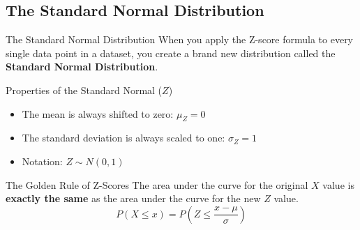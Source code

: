 \subsection{The Standard Normal Distribution}
\begin{frame}{The Standard Normal Distribution}
    When you apply the Z-score formula to every single data point in a dataset, you create a brand new distribution called the \textbf{Standard Normal Distribution}.

    \vspace{0.2cm}
    \begin{block}{Properties of the Standard Normal ($Z$)}
        \begin{itemize}
            \item The mean is always shifted to zero: $\mu_Z = 0$
            \item The standard deviation is always scaled to one: $\sigma_Z = 1$
            \item Notation: $Z \sim N(0, 1)$
        \end{itemize}
    \end{block}

    \pause \vspace{0.2cm}
    \begin{alertblock}{The Golden Rule of Z-Scores}
        The area under the curve for the original $X$ value is \textbf{exactly the same} as the area under the curve for the new $Z$ value. 
        \[ P(X \leq x) = P\left(Z \leq \frac{x - \mu}{\sigma}\right) \]
    \end{alertblock}
\end{frame}

